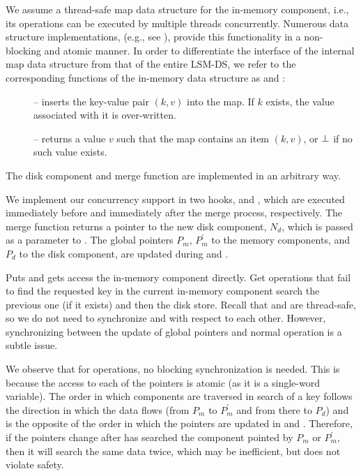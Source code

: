 We assume a thread-safe map data structure for the in-memory component,
i.e., its operations can be executed by multiple threads concurrently.
Numerous data structure implementations, (e.g., see \cite{libcds,Herlihy2008,ConcurrencyInWindows2008}), provide this functionality in a non-blocking and atomic manner.
%
In order to differentiate the interface of the internal map data structure from
that of the entire LSM-DS, we refer to the corresponding functions of the in-memory data structure
as  and :
\begin{description}
\item [] -- inserts the key-value pair $(k,v)$ into the map.
If $k$  exists, the value associated with it is over-written.
\item[] -- returns a value $v$ such that
 the map contains an item $(k,v)$, or $\bot$ if no such value exists.
\end{description}

The disk component and merge function are implemented in an arbitrary way.

We implement our concurrency support in two hooks,  and ,
which are executed immediately before and immediately after the merge process, respectively.
The merge function returns a pointer to the new disk component, $N_d$, which is passed as a
parameter to .
The global pointers $P_m$, $P_m^{'}$ to the memory components, and   $P_d$ to
the disk component, are updated during  and .

Puts and gets access the in-memory component directly.
Get operations that fail to find the requested key in the current in-memory component search
the previous one (if it exists) and then the disk store.
Recall that   and 
are thread-safe, so we do not need to synchronize  and 
with respect to each other. However, synchronizing between the update of global
pointers and normal operation is a subtle issue.

We observe that for  operations, no blocking synchronization is needed.
This is because the access to each of the pointers is atomic (as it is a
single-word variable).
The order in which components are traversed in search of a key follows
the direction in which the data flows (from $P_m$ to $P_m^{'}$ and from there to
$P_d$) and is the opposite of the order in which the pointers are updated in
 and . Therefore, if the pointers
change after  has searched the component pointed by $P_m$ or $P_m^{'}$,
then it will search the same data twice, which may be inefficient, but does not violate safety.

